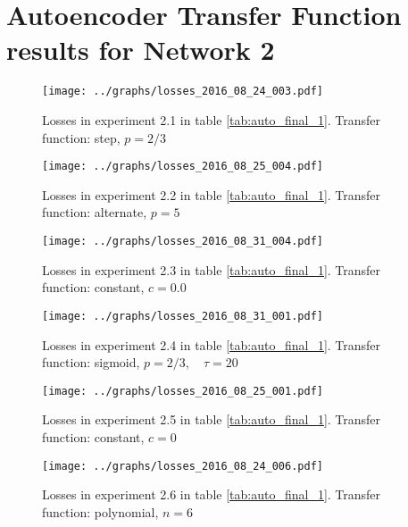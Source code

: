 \appendix
\chapter{Autoencoder Transfer Function results for Network 2} \label{appendix2}


      \begin{figure}[!h]
      \centering
      \texttt{[image: ../graphs/losses\_2016\_08\_24\_003.pdf]}
      \caption{Losses in experiment 2.1 in table \ref{tab:auto_final_1}. Transfer function: step, $p=2/3$}
      \label{fig:alternate}
      \end{figure}

      \begin{figure}[!h]
      \centering
      \texttt{[image: ../graphs/losses\_2016\_08\_25\_004.pdf]}
      \caption{Losses in experiment 2.2 in table \ref{tab:auto_final_1}. Transfer function: alternate, $p=5$}
      \label{fig:alternate}
      \end{figure}

      \begin{figure}[!h]
      \centering \texttt{[image: ../graphs/losses\_2016\_08\_31\_004.pdf]}
      \caption{Losses in experiment 2.3 in table \ref{tab:auto_final_1}. Transfer function: constant, $c=0.0$}
      \label{fig:alternate} \end{figure}

      \begin{figure}[!h]
      \centering
      \texttt{[image: ../graphs/losses\_2016\_08\_31\_001.pdf]}
      \caption{Losses in experiment 2.4 in table \ref{tab:auto_final_1}. Transfer function: sigmoid, $p=2/3,\quad \tau=20$}
      \label{fig:alternate}
      \end{figure}

      \begin{figure}[!h]
      \centering
      \texttt{[image: ../graphs/losses\_2016\_08\_25\_001.pdf]}
      \caption{Losses in experiment 2.5 in table \ref{tab:auto_final_1}. Transfer function: constant, $c=0$}
      \label{fig:alternate}
      \end{figure}

      \begin{figure}[!h]
      \centering
      \texttt{[image: ../graphs/losses\_2016\_08\_24\_006.pdf]}
      \caption{Losses in experiment 2.6 in table \ref{tab:auto_final_1}. Transfer function: polynomial, $n=6$}
      \label{fig:alternate}
      \end{figure}
